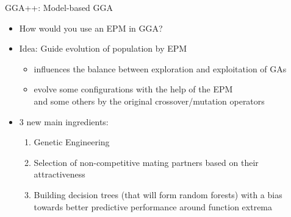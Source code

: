 \begin{frame}[c]{GGA++: Model-based GGA }

\begin{itemize}
  \item How would you use an EPM in GGA? \hands
  \pause
  \item Idea: Guide evolution of population by EPM
  \begin{itemize}
    \item influences the balance between exploration and exploitation of GAs
    \item evolve some configurations with the help of the EPM\\
    	  and some others by the original crossover/mutation operators
  \end{itemize}
  \medskip
  \pause
  \item 3 new main ingredients:
  \begin{enumerate}
    \item Genetic Engineering
    \item Selection of non-competitive mating partners based on their attractiveness
    \item Building decision trees (that will form random forests) with a bias towards better predictive performance around function extrema
  \end{enumerate}
\end{itemize}

\end{frame}

